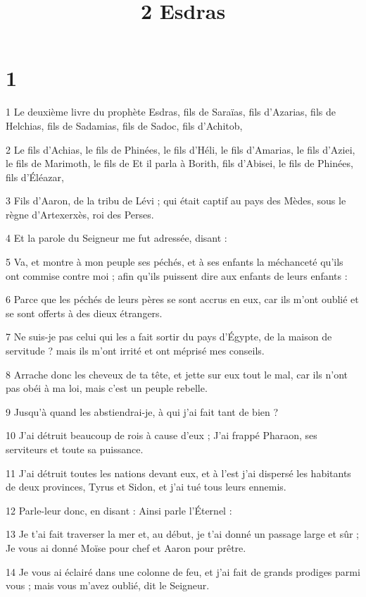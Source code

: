 

\title{2 Esdras}

\chapter{1}

\par 1 Le deuxième livre du prophète Esdras, fils de Saraïas, fils d'Azarias, fils de Helchias, fils de Sadamias, fils de Sadoc, fils d'Achitob,
\par 2 Le fils d'Achias, le fils de Phinées, le fils d'Héli, le fils d'Amarias, le fils d'Aziei, le fils de Marimoth, le fils de Et il parla à Borith, fils d'Abisei, le fils de Phinées, fils d'Éléazar,
\par 3 Fils d'Aaron, de la tribu de Lévi ; qui était captif au pays des Mèdes, sous le règne d'Artexerxès, roi des Perses.
\par 4 Et la parole du Seigneur me fut adressée, disant :
\par 5 Va, et montre à mon peuple ses péchés, et à ses enfants la méchanceté qu'ils ont commise contre moi ; afin qu'ils puissent dire aux enfants de leurs enfants :
\par 6 Parce que les péchés de leurs pères se sont accrus en eux, car ils m'ont oublié et se sont offerts à des dieux étrangers.
\par 7 Ne suis-je pas celui qui les a fait sortir du pays d'Égypte, de la maison de servitude ? mais ils m'ont irrité et ont méprisé mes conseils.
\par 8 Arrache donc les cheveux de ta tête, et jette sur eux tout le mal, car ils n'ont pas obéi à ma loi, mais c'est un peuple rebelle.
\par 9 Jusqu'à quand les abstiendrai-je, à qui j'ai fait tant de bien ?
\par 10 J'ai détruit beaucoup de rois à cause d'eux ; J'ai frappé Pharaon, ses serviteurs et toute sa puissance.
\par 11 J'ai détruit toutes les nations devant eux, et à l'est j'ai dispersé les habitants de deux provinces, Tyrus et Sidon, et j'ai tué tous leurs ennemis.
\par 12 Parle-leur donc, en disant : Ainsi parle l'Éternel :
\par 13 Je t'ai fait traverser la mer et, au début, je t'ai donné un passage large et sûr ; Je vous ai donné Moïse pour chef et Aaron pour prêtre.
\par 14 Je vous ai éclairé dans une colonne de feu, et j'ai fait de grands prodiges parmi vous ; mais vous m'avez oublié, dit le Seigneur.
